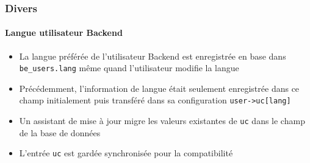 %

\begin{frame}[fragile]
	\frametitle{Divers}
	\framesubtitle{Langue utilisateur Backend}

	\begin{itemize}
		\item La langue préférée de l'utilisateur Backend est enregistrée
		    en base dans \texttt{be\_users.lang} même quand l'utilisateur
		    modifie la langue
		\item Précédemment, l'information de langue était seulement enregistrée
		    dans ce champ initialement puis transféré dans sa configuration
			\texttt{user->uc[lang]}
		\item Un assistant de mise à jour migre les valeurs existantes de \texttt{uc}
			dans le champ de la base de données
		\item L'entrée \texttt{uc} est gardée synchronisée pour la compatibilité
	\end{itemize}

\end{frame}


